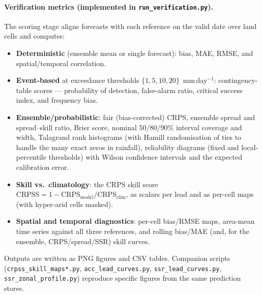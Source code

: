 \documentclass[11pt]{article}
\newcommand{\code}[1]{\texttt{\small #1}}
\newcommand{\mmday}{mm\,day$^{-1}$}
\begin{document}
\paragraph{Verification metrics (implemented in \code{run\_verification.py}).}
The scoring stage aligns forecasts with each reference on the valid date over
land cells and computes:
\begin{itemize}[nosep,leftmargin=1.4em]
  \item \textbf{Deterministic} (ensemble mean or single forecast): bias, MAE,
        RMSE, and spatial/temporal correlation.
  \item \textbf{Event-based} at exceedance thresholds $\{1,5,10,20\}$~\mmday:
        contingency-table scores --- probability of detection, false-alarm
        ratio, critical success index, and frequency bias.
  \item \textbf{Ensemble/probabilistic}: fair (bias-corrected) CRPS, ensemble
        spread and spread--skill ratio, Brier score, nominal $50/80/90\%$
        interval coverage and width, Talagrand rank histograms (with
        Hamill randomisation of ties to handle the many exact zeros in
        rainfall), reliability diagrams (fixed and local-percentile thresholds)
        with Wilson confidence intervals and the expected calibration error.
  \item \textbf{Skill vs.\ climatology}: the CRPS skill score
        $\text{CRPSS}=1-\text{CRPS}_{\text{model}}/\text{CRPS}_{\text{clim}}$,
        as scalars per lead and as per-cell maps (with hyper-arid cells masked).
  \item \textbf{Spatial and temporal diagnostics}: per-cell bias/RMSE maps,
        area-mean time series against all three references, and rolling
        bias/MAE (and, for the ensemble, CRPS/spread/SSR) skill curves.
\end{itemize}
Outputs are written as PNG figures and CSV tables. Companion scripts
(\code{crpss\_skill\_maps*.py}, \code{acc\_lead\_curves.py},
\code{ssr\_lead\_curves.py}, \code{ssr\_zonal\_profile.py}) reproduce specific
figures from the same prediction stores.
\end{document}
